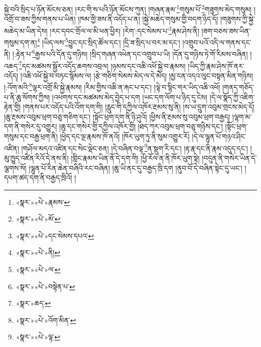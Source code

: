 སྐྱེ་བའི་སྲིད་པ་ཉོན་མོངས་ཅན། །རང་གི་ས་པའི་ཉོན་མོངས་ཀུན། །གཞན་རྣམ་\footnote{«སྣར་»«པེ་»རྣམས་}གསུམ་པོ་\footnote{«སྣར་»«པེ་»མོ་}གཟུགས་མེད་གསུམ། །འགྲོ་བ་ཟས་ཀྱིས་གནས་པ་ཡིན། །ཁམ་གྱི་ཟས་ནི་འདོད་པ་ན། །སྐྱེ་མཆེད་གསུམ་གྱི་བདག་ཉིད་དོ། །གཟུགས་ཀྱི་སྐྱེ་མཆེད་མ་ཡིན་དེས། །རང་དབང་གྲོལ་ལ་མི་ཕན་ཕྱིར། །རེག་:དང་སེམས་པ་\footnote{«སྣར་»«པེ་»དང་སེམས་དཔའ་}རྣམ་ཤེས་ནི། །ཟག་བཅས་ཟས་ཡིན་གསུམ་དག་ན།\footnote{«སྣར་»«པེ་»ནི།} །ཡིད་ལས་\footnote{«སྣར་»«པེ་»ལ་}བྱུང་དང་སྲིད་ཚོལ་དང་། །དྲི་ཟ་སྲིད་པ་བར་མ་དང་། །འགྲུབ་པའོ་འདི་ལ་གནས་དང་ནི། །:རྟེན་པ་\footnote{«སྣར་»«པེ་»བསྟེན་པ་}རྒྱས་པའི་དོན་དུ་གཉིས། །སྲིད་གཞན་འཕེན་དང་འགྲུབ་པ་ཡི། །དོན་དུ་གཉིས་ཏེ་གོ་རིམས་བཞིན། །འཆད་\footnote{«སྣར་»ཆད་}དང་མཚམས་སྦྱོར་འདོད་ཆགས་འབྲལ། །ཉམས་དང་འཆི་འཕོ་སྐྱེ་བ་རྣམས། །ཡིད་ཀྱི་རྣམ་ཤེས་ཁོ་ནར་འདོད། །འཆི་འཕོ་སྐྱེ་བ་བཏང་སྙོམས་ལ། །རྩེ་གཅིག་སེམས་མེད་ལ་དེ་མེད། །མྱ་ངན་འདའ་ལུང་བསྟན་མིན་གཉིས། །:འོག་མའི་\footnote{«སྣར་»«པེ་»འོག་མིན་}ལྷར་འགྲོ་མི་སྐྱེ་རྣམས། །རིམ་གྱིས་འཆི་ན་རྐང་པ་དང་། །ལྟེ་བ་སྙིང་གར་ཡིད་འཆི་འཕོ། །གནད་གཅོད་པ་ནི་ཆུ་སོགས་ཀྱིས། །འཕགས་དང་མཚམས་མེད་བྱེད་པ་དག །ཡང་དག་ལོག་པ་ཉིད་དུ་ངེས། །དེ་ལ་སྣོད་ཀྱི་འཇིག་རྟེན་གྱི། །གནས་པར་འདོད་པའི་འོག་དག་གི། །རླུང་གི་དཀྱིལ་འཁོར་རྔམས་སུ་ནི། །ས་ཡ་དྲུག་འབུམ་གྲངས་མེད་དོ། །ཆུ་རྔམས་འབུམ་ཕྲག་བཅུ་གཅིག་དང་། །སྟོང་ཕྲག་དག་ནི་ཉི་ཤུའོ། །ཕྱིས་ནི་རྔམས་སུ་འབུམ་ཕྲག་བརྒྱད། །ལྷག་མ་དག་ནི་གསེར་དུ་འགྱུར། །ཆུ་དང་གསེར་གྱི་དཀྱིལ་འཁོར་གྱི། །ཐད་ཀར་འབུམ་ཕྲག་བཅུ་གཉིས་དང་། །སྟོང་ཕྲག་གསུམ་དང་བརྒྱ་ཕྲག་ནི། །ཕྱེད་དང་ལྔ་རྣམས་ཁོ་ནའོ། །ཁོར་ཡུག་ཏུ་ནི་སུམ་འགྱུར་རོ། །དེ་ལ་ལྷུན་པོ་གཉའ་ཤིང་འཛིན། །གཤོལ་མདའ་འཛིན་དང་སེང་ལྡེང་ཅན། །དེ་བཞིན་བལྟ་\footnote{«སྣར་»«པེ་»ལྟ་}ན་སྡུག་རི་དང་། །རྟ་རྣ་དང་ནི་རྣམ་འདུད་དང་། །མུ་ཁྱུད་འཛིན་རིའོ་དེ་ནས་ནི། །གླིང་རྣམས་ཡིན་ནོ་དེ་དག་གི། །ཕྱི་རོལ་ན་ནི་ཁོར་ཡུག་སྟེ། །བདུན་ནི་གསེར་ཡིན་དེ་ལྕགས་སོ། །ལྷུན་པོ་རིན་ཆེན་བཞིའི་རང་བཞིན། །ཆུ་ཡི་ནང་དུ་བརྒྱད་ཁྲི་དག །ནུབ་བོ་དེ་བཞིན་སྟེང་དུ་ཡང་། །དཔག་ཚད་དག་ནི་བརྒྱད་ཁྲིའོ། །
